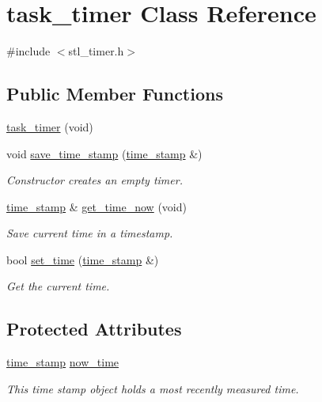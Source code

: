 \hypertarget{classtask__timer}{\section{task\-\_\-timer Class Reference}
\label{classtask__timer}
}


{\ttfamily \#include $<$stl\-\_\-timer.\-h$>$}

\subsection*{Public Member Functions}
\begin{DoxyCompactItemize}
\item 
\hyperlink{classtask__timer_af8d96cae8e4b94970a96df6fef2a75b8}{task\-\_\-timer} (void)
\item 
void \hyperlink{classtask__timer_a56c09d1da6107f284d12e079f0de62ed}{save\-\_\-time\-\_\-stamp} (\hyperlink{classtime__stamp}{time\-\_\-stamp} \&)
\begin{DoxyCompactList}\small\item\em Constructor creates an empty timer. \end{DoxyCompactList}\item 
\hyperlink{classtime__stamp}{time\-\_\-stamp} \& \hyperlink{classtask__timer_a2723e16b4d9e7c4f997547a9be1820ed}{get\-\_\-time\-\_\-now} (void)
\begin{DoxyCompactList}\small\item\em Save current time in a timestamp. \end{DoxyCompactList}\item 
bool \hyperlink{classtask__timer_ae793fba368c36c813ae581c358c33c48}{set\-\_\-time} (\hyperlink{classtime__stamp}{time\-\_\-stamp} \&)
\begin{DoxyCompactList}\small\item\em Get the current time. \end{DoxyCompactList}\end{DoxyCompactItemize}
\subsection*{Protected Attributes}
\begin{DoxyCompactItemize}
\item 
\hypertarget{classtask__timer_a8c7dab1af76b4583fa9c6a744c2dbff0}{\hyperlink{classtime__stamp}{time\-\_\-stamp} \hyperlink{classtask__timer_a8c7dab1af76b4583fa9c6a744c2dbff0}{now\-\_\-time}}\label{classtask__timer_a8c7dab1af76b4583fa9c6a744c2dbff0}

\begin{DoxyCompactList}\small\item\em This time stamp object holds a most recently measured time. \end{DoxyCompactList}\end{DoxyCompactItemize}


